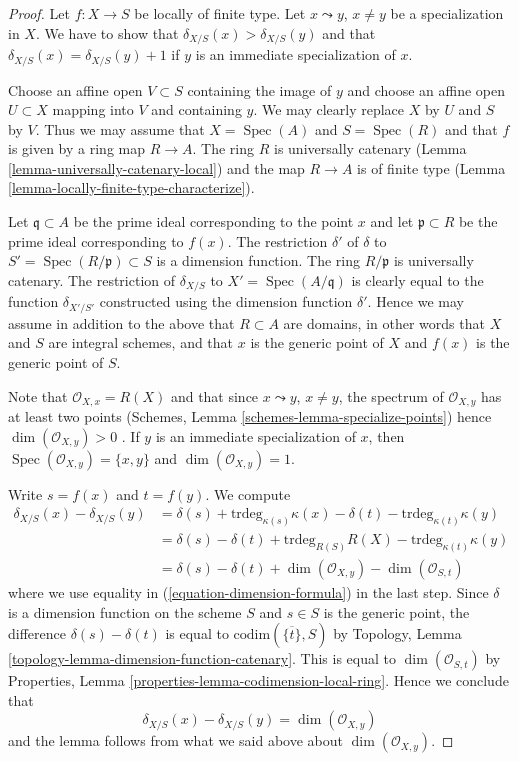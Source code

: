 \documentclass[10pt,a4paper]{amsart}
\theoremstyle{plain}
\theoremstyle{definition}
\theoremstyle{remark}
\numberwithin{equation}{subsection}
\def\Spec{\mathop{\mathrm{Spec}}}
\begin{document}
\begin{proof}
Let $f : X \to S$ be locally of finite type.
Let $x \leadsto y$, $x \not = y$ be a specialization in $X$.
We have to show that $\delta_{X/S}(x) > \delta_{X/S}(y)$ and
that $\delta_{X/S}(x) = \delta_{X/S}(y) + 1$ if $y$ is an
immediate specialization of $x$.

\medskip\noindent
Choose an affine open $V \subset S$ containing the image of
$y$ and choose an affine open $U \subset X$ mapping into $V$
and containing $y$. We may clearly replace $X$ by $U$ and
$S$ by $V$. Thus we may assume that $X = \Spec(A)$
and $S = \Spec(R)$ and that $f$ is given by a ring
map $R \to A$. The ring $R$ is universally catenary
(Lemma \ref{lemma-universally-catenary-local})
and the map $R \to A$ is of finite type
(Lemma \ref{lemma-locally-finite-type-characterize}).

\medskip\noindent
Let $\mathfrak q \subset A$ be the prime ideal corresponding
to the point $x$ and let $\mathfrak p \subset R$ be the prime
ideal corresponding to $f(x)$. The restriction $\delta'$ of $\delta$
to $S' = \Spec(R/\mathfrak p) \subset S$ is a dimension
function. The ring $R/\mathfrak p$ is universally catenary.
The restriction of $\delta_{X/S}$ to $X' = \Spec(A/\mathfrak q)$
is clearly equal to the function $\delta_{X'/S'}$ constructed
using the dimension function $\delta'$. Hence we may assume
in addition to the above that $R \subset A$ are domains, in
other words that $X$ and $S$ are integral schemes, and that
$x$ is the generic point of $X$ and $f(x)$ is the generic point of $S$.

\medskip\noindent
Note that $\mathcal{O}_{X, x} = R(X)$ and that since $x \leadsto y$,
$x \not = y$, the spectrum of $\mathcal{O}_{X, y}$ has at least
two points
(Schemes, Lemma \ref{schemes-lemma-specialize-points})
hence $\dim(\mathcal{O}_{X, y}) > 0$ .
If $y$ is an immediate specialization of $x$, then
$\Spec(\mathcal{O}_{X, y}) = \{x, y\}$ and
$\dim(\mathcal{O}_{X, y}) = 1$.

\medskip\noindent
Write $s = f(x)$ and $t = f(y)$. We compute
\begin{align*}
\delta_{X/S}(x) - \delta_{X/S}(y)
& =
\delta(s) + \text{trdeg}_{\kappa(s)} \kappa(x)
- \delta(t) - \text{trdeg}_{\kappa(t)} \kappa(y) \\
& =
\delta(s) - \delta(t) +
\text{trdeg}_{R(S)} R(X) - \text{trdeg}_{\kappa(t)} \kappa(y) \\
& =
\delta(s) - \delta(t) + \dim(\mathcal{O}_{X, y})
- \dim(\mathcal{O}_{S, t})
\end{align*}
where we use equality in (\ref{equation-dimension-formula}) in
the last step. Since $\delta$ is a dimension function on the scheme $S$
and $s \in S$ is the generic point, the difference
$\delta(s) - \delta(t)$ is equal to $\text{codim}(\overline{\{t\}}, S)$ by
Topology, Lemma \ref{topology-lemma-dimension-function-catenary}.
This is equal to $\dim(\mathcal{O}_{S, t})$ by
Properties, Lemma
\ref{properties-lemma-codimension-local-ring}.
Hence we conclude that
$$
\delta_{X/S}(x) - \delta_{X/S}(y) = \dim(\mathcal{O}_{X, y})
$$
and the lemma follows from what we said above about $\dim(\mathcal{O}_{X, y})$.
\end{proof}
\end{document}
